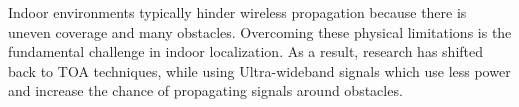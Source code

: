 Indoor environments typically hinder wireless propagation because there is uneven coverage and many obstacles. Overcoming these physical limitations is the fundamental challenge in indoor localization. As a result, research has shifted back to TOA techniques, while using Ultra-wideband signals which use less power and increase the chance of propagating signals around obstacles.

%

